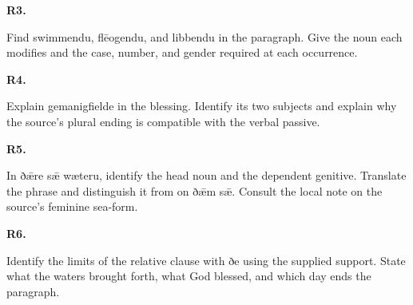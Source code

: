 \par\begin{minipage}{\linewidth}\raggedright
\textbf{R3.}

Find swimmendu, flēogendu, and libbendu in the paragraph. Give the noun each modifies and the case, number, and gender required at each occurrence.

\end{minipage}\par\addvspace{4pt}

\par\begin{minipage}{\linewidth}\raggedright
\textbf{R4.}

Explain gemanigfielde in the blessing. Identify its two subjects and explain why the source’s plural ending is compatible with the verbal passive.

\end{minipage}\par\addvspace{4pt}

\par\begin{minipage}{\linewidth}\raggedright
\textbf{R5.}

In ðǣre sǣ wæteru, identify the head noun and the dependent genitive. Translate the phrase and distinguish it from on ðǣm sǣ. Consult the local note on the source’s feminine sea-form.

\end{minipage}\par\addvspace{4pt}

\par\begin{minipage}{\linewidth}\raggedright
\textbf{R6.}

Identify the limits of the relative clause with ðe using the supplied support. State what the waters brought forth, what God blessed, and which day ends the paragraph.

\end{minipage}\par\addvspace{4pt}

